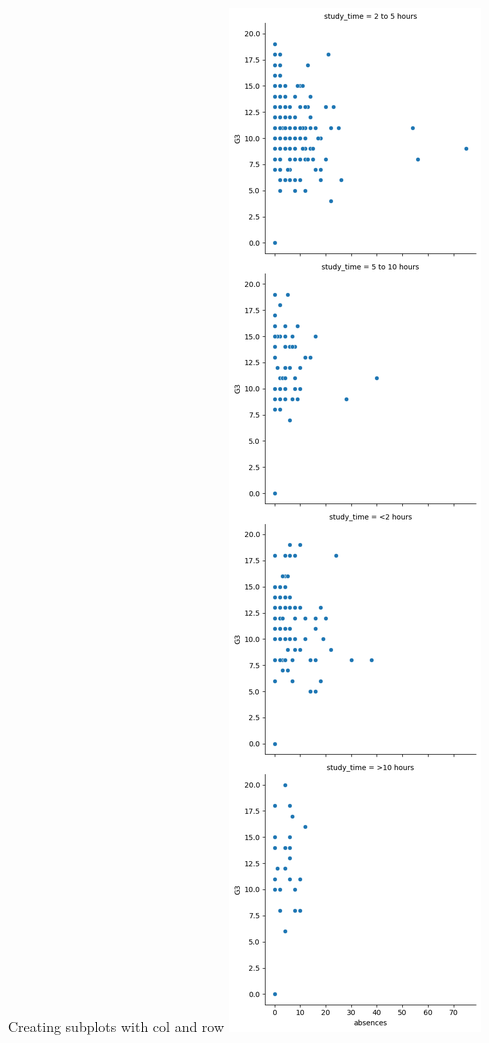 \documentclass[
  ignorenonframetext,
]{beamer}
\begin{document}
\begin{frame}{Creating subplots with col and row}
\label{creating-subplots-with-col-and-row-8}
\includegraphics{../images/im264.png}
\end{frame}
\end{document}
